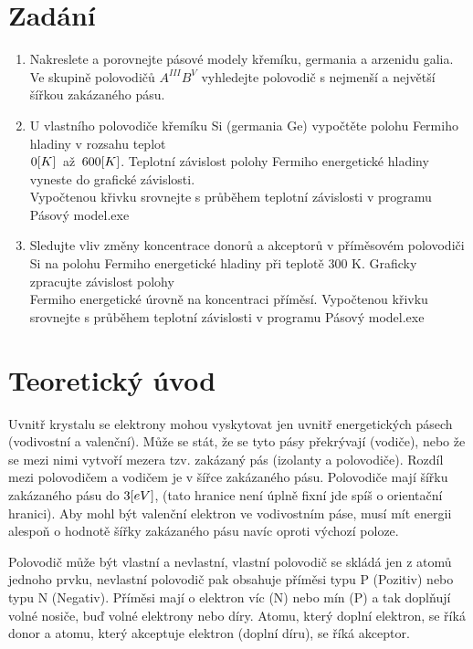 \documentclass{article}
\begin{document}


\section*{Zadání}
\begin{enumerate}
    \item Nakreslete a porovnejte pásové modely křemíku, germania a arzenidu galia. Ve skupině polovodičů \(A^{III}B^{V}\) vyhledejte polovodič s nejmenší a největší šířkou zakázaného pásu.
    \item U vlastního polovodiče křemíku Si (germania Ge) vypočtěte polohu Fermiho hladiny v rozsahu teplot \\\(0\-[K]\)~až~\(600\-[K]\). Teplotní závislost polohy Fermiho energetické hladiny vyneste do grafické závislosti.\\Vypočtenou křivku srovnejte s průběhem teplotní závislosti v programu Pásový model.exe
    \item Sledujte vliv změny koncentrace donorů a akceptorů v příměsovém polovodiči Si na polohu Fermiho energetické hladiny při teplotě 300 K. Graficky zpracujte závislost polohy \\Fermiho energetické úrovně na koncentraci příměsí. Vypočtenou křivku srovnejte s průběhem teplotní závislosti v programu Pásový model.exe
\end{enumerate}

\section*{Teoretický úvod}
Uvnitř krystalu se elektrony mohou vyskytovat jen uvnitř energetických pásech (vodivostní a valenční).
Může se stát, že se tyto pásy překrývají (vodiče), nebo že se mezi nimi vytvoří mezera tzv. zakázaný pás (izolanty a polovodiče).
Rozdíl mezi polovodičem a vodičem je v šířce zakázaného pásu.
Polovodiče mají šířku zakázaného pásu do \(3\-[eV]\), (tato hranice není úplně fixní jde spíš o orientační hranici).
Aby mohl být valenční elektron ve vodivostním páse, musí mít energii alespoň o hodnotě šířky zakázaného pásu navíc oproti výchozí poloze.

Polovodič může být vlastní a nevlastní, vlastní polovodič se skládá jen z atomů jednoho prvku, nevlastní polovodič pak obsahuje příměsi typu P (Pozitiv) nebo typu N (Negativ).
Příměsi mají o elektron víc (N) nebo mín (P) a tak doplňují volné nosiče, buď volné elektrony nebo díry.
Atomu, který doplní elektron, se říká donor a atomu, který akceptuje elektron (doplní díru), se říká akceptor.
\end{document}
